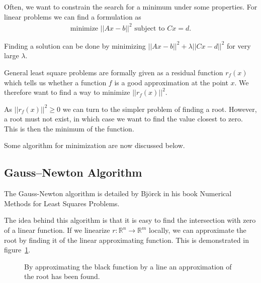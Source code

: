 Often, we want to constrain the search for a minimum under some properties. For linear problems we can find a formulation as
\begin{align*}
	\text{minimize } ||Ax-b||^2 \text{ subject to } Cx=d.
\end{align*}

\noindent
Finding a solution can be done by minimizing $||Ax-b||^2 + \lambda ||Cx-d||^2$ for very large $\lambda$.

General least square problems are formally given as a residual function $r_f(x)$ which tells us whether a function $f$ is a good approximation at the point $x$. We therefore want to find a way to minimize $||r_f(x)||^2$.

As $||r_f(x)||^2 \geq 0$ we can turn to the simpler problem of finding a root. However, a root must not exist, in which case we want to find the value closest to zero. This is then the minimum of the function.

Some algorithm for minimization are now discussed below.

\subsection{Gauss–Newton Algorithm}

The Gauss-Newton algorithm is detailed by Björck in his book Numerical Methods for Least Squares Problems\cite{Bjoerck1996}.

The idea behind this algorithm is that it is easy to find the intersection with zero of a linear function. If we linearize $r\colon\mathds{R}^n \rightarrow \mathds{R}^m$ locally, we can approximate the root by finding it of the linear approximating function. This is demonstrated in figure~\ref{fig:approx_root_with_lin}.

\begin{figure}[h]
	\centering
	\caption{By approximating the black function by a line an approximation of the root has been found.}
	\label{fig:approx_root_with_lin}
\end{figure}

